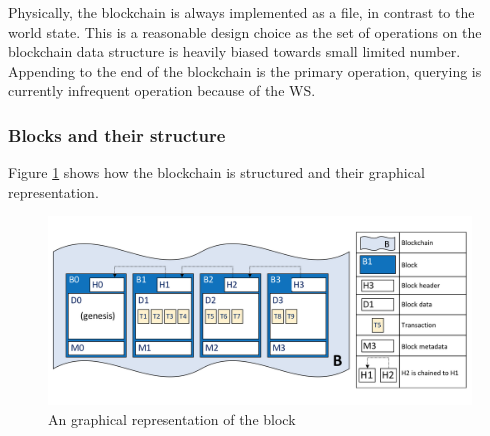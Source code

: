 \documentclass[a4paper,11pt]{report}
\begin{document}
Physically, the blockchain is always implemented as a file, in contrast to the world state. This is a reasonable design choice as the set of operations on the blockchain data structure is heavily biased towards small limited number. Appending to the end of the blockchain is the primary operation, querying is currently infrequent operation because of the WS. 

\subsubsection{Blocks and their structure}

Figure \ref{fabricBlock} shows how the blockchain is structured and their graphical representation. 

\begin{figure}[h]
\centering
  \includegraphics[width=16cm]{ledgerdiagram2.png}
  \caption{An graphical representation of the block \cite{fabledger}}
  \label{fabricBlock}
\end{figure}
\end{document}
